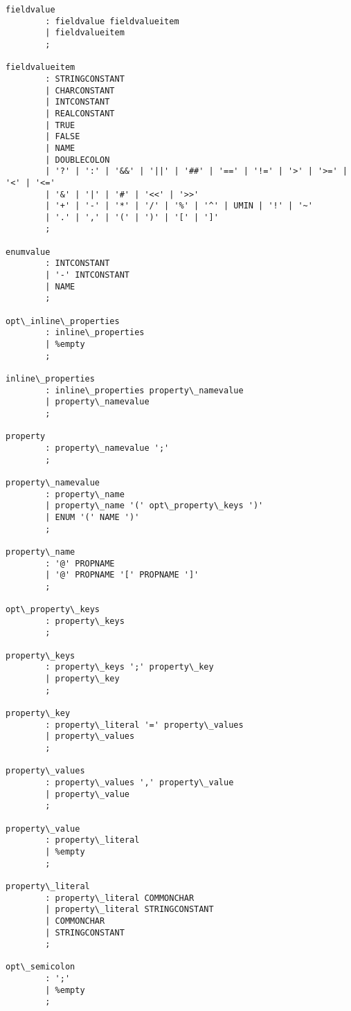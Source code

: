 \begin{Verbatim}[commandchars=\\\{\}]
fieldvalue
        : fieldvalue fieldvalueitem
        | fieldvalueitem
        ;

fieldvalueitem
        : STRINGCONSTANT
        | CHARCONSTANT
        | INTCONSTANT
        | REALCONSTANT
        | TRUE
        | FALSE
        | NAME
        | DOUBLECOLON
        | '?' | ':' | '&&' | '||' | '##' | '==' | '!=' | '>' | '>=' | '<' | '<='
        | '&' | '|' | '#' | '<<' | '>>'
        | '+' | '-' | '*' | '/' | '%' | '^' | UMIN | '!' | '~'
        | '.' | ',' | '(' | ')' | '[' | ']'
        ;

enumvalue
        : INTCONSTANT
        | '-' INTCONSTANT
        | NAME
        ;

opt\_inline\_properties
        : inline\_properties
        | %empty
        ;

inline\_properties
        : inline\_properties property\_namevalue
        | property\_namevalue
        ;

property
        : property\_namevalue ';'
        ;

property\_namevalue
        : property\_name
        | property\_name '(' opt\_property\_keys ')'
        | ENUM '(' NAME ')'
        ;

property\_name
        : '@' PROPNAME
        | '@' PROPNAME '[' PROPNAME ']'
        ;

opt\_property\_keys
        : property\_keys
        ;

property\_keys
        : property\_keys ';' property\_key
        | property\_key
        ;

property\_key
        : property\_literal '=' property\_values
        | property\_values
        ;

property\_values
        : property\_values ',' property\_value
        | property\_value
        ;

property\_value
        : property\_literal
        | %empty
        ;

property\_literal
        : property\_literal COMMONCHAR
        | property\_literal STRINGCONSTANT
        | COMMONCHAR
        | STRINGCONSTANT
        ;

opt\_semicolon
        : ';'
        | %empty
        ;
\end{Verbatim}



